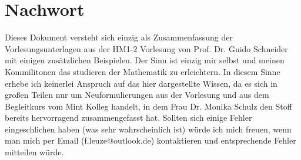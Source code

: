 \documentclass[12pt,a4paper]{report}%
\numberwithin{equation}{section}
\numberwithin{equation}{subsection}
\begin{document}
  \newpage
\section{Nachwort}
Dieses Dokument versteht sich einzig als Zusammenfassung der Vorlesungsunterlagen aus der HM1-2 Vorlesung von Prof. Dr. Guido Schneider mit einigen zusätzlichen Beispielen. Der Sinn ist einzig mir selbst und meinen Kommilitonen das studieren der Mathematik zu erleichtern. In diesem Sinne erhebe ich keinerlei Anspruch auf das hier dargestellte Wissen, da es sich in großen Teilen nur um Neuformulierungen aus der Vorlesung und aus dem Begleitkurs vom Mint Kolleg handelt, in dem Frau Dr. Monika Schulz den Stoff bereits hervorragend zusammengefasst hat. Sollten sich einige Fehler eingeschlichen haben (was sehr wahrscheinlich ist) würde ich mich freuen, wenn man mich per Email (f.leuze@outlook.de) kontaktieren und entsprechende Fehler mitteilen würde.

\end{document}
